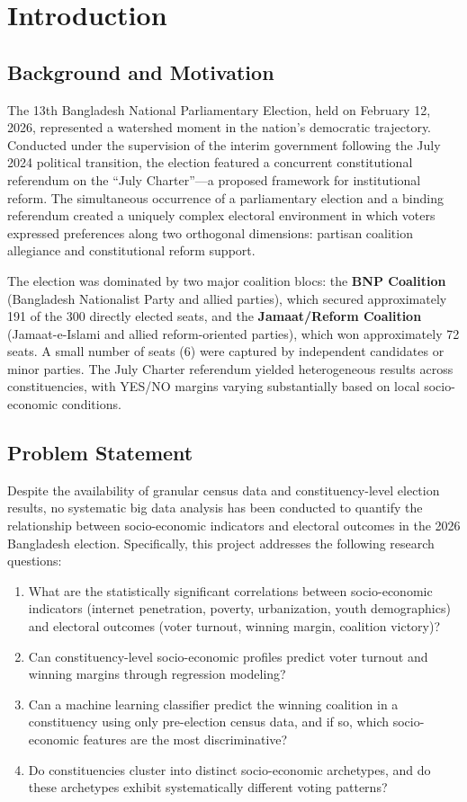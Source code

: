 \documentclass[12pt, a4paper]{article}
\begin{document}
\section{Introduction}

\subsection{Background and Motivation}
The 13th Bangladesh National Parliamentary Election, held on February 12, 2026, represented a watershed moment in the nation's democratic trajectory. Conducted under the supervision of the interim government following the July 2024 political transition, the election featured a concurrent constitutional referendum on the ``July Charter''---a proposed framework for institutional reform. The simultaneous occurrence of a parliamentary election and a binding referendum created a uniquely complex electoral environment in which voters expressed preferences along two orthogonal dimensions: partisan coalition allegiance and constitutional reform support.

The election was dominated by two major coalition blocs: the \textbf{BNP Coalition} (Bangladesh Nationalist Party and allied parties), which secured approximately 191 of the 300 directly elected seats, and the \textbf{Jamaat/Reform Coalition} (Jamaat-e-Islami and allied reform-oriented parties), which won approximately 72 seats. A small number of seats (6) were captured by independent candidates or minor parties. The July Charter referendum yielded heterogeneous results across constituencies, with YES/NO margins varying substantially based on local socio-economic conditions.

\subsection{Problem Statement}
Despite the availability of granular census data and constituency-level election results, no systematic big data analysis has been conducted to quantify the relationship between socio-economic indicators and electoral outcomes in the 2026 Bangladesh election. Specifically, this project addresses the following research questions:

\begin{enumerate}[label=\textbf{RQ\arabic*:}]
    \item What are the statistically significant correlations between socio-economic indicators (internet penetration, poverty, urbanization, youth demographics) and electoral outcomes (voter turnout, winning margin, coalition victory)?
    \item Can constituency-level socio-economic profiles predict voter turnout and winning margins through regression modeling?
    \item Can a machine learning classifier predict the winning coalition in a constituency using only pre-election census data, and if so, which socio-economic features are the most discriminative?
    \item Do constituencies cluster into distinct socio-economic archetypes, and do these archetypes exhibit systematically different voting patterns?
\end{enumerate}
\end{document}
